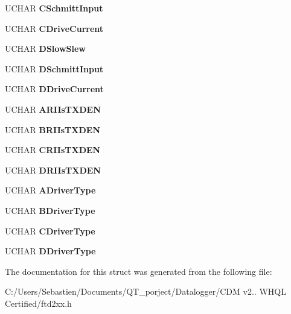 \begin{DoxyCompactItemize}
U\+C\+H\+AR {\bfseries C\+Schmitt\+Input}
\item 
\mbox{\label{structft__eeprom__4232h_a28fd0e83320d2b18d8e3494f019e8f4c}} 
U\+C\+H\+AR {\bfseries C\+Drive\+Current}
\item 
\mbox{\label{structft__eeprom__4232h_ae32b979b9db358e8b6613e41ed201110}} 
U\+C\+H\+AR {\bfseries D\+Slow\+Slew}
\item 
\mbox{\label{structft__eeprom__4232h_aba9def054b418e85177c70cae98cb17e}} 
U\+C\+H\+AR {\bfseries D\+Schmitt\+Input}
\item 
\mbox{\label{structft__eeprom__4232h_a36cb4f439c051c485013966f16adc5ab}} 
U\+C\+H\+AR {\bfseries D\+Drive\+Current}
\item 
\mbox{\label{structft__eeprom__4232h_aa9c900ec8d69e1a792a4b9bac1b4eeb9}} 
U\+C\+H\+AR {\bfseries A\+R\+I\+Is\+T\+X\+D\+EN}
\item 
\mbox{\label{structft__eeprom__4232h_aa9e48949d47395e2a805d93d4affa572}} 
U\+C\+H\+AR {\bfseries B\+R\+I\+Is\+T\+X\+D\+EN}
\item 
\mbox{\label{structft__eeprom__4232h_a7b4666be110ff5f59976c3a5f67ba13d}} 
U\+C\+H\+AR {\bfseries C\+R\+I\+Is\+T\+X\+D\+EN}
\item 
\mbox{\label{structft__eeprom__4232h_aff58f44eb2769cd3d614cdd03357a56c}} 
U\+C\+H\+AR {\bfseries D\+R\+I\+Is\+T\+X\+D\+EN}
\item 
\mbox{\label{structft__eeprom__4232h_a6a17d8b26142bd25157ea275e8034f11}} 
U\+C\+H\+AR {\bfseries A\+Driver\+Type}
\item 
\mbox{\label{structft__eeprom__4232h_a6a5cbfcb0e59bd89ed6338f44f8c5b5c}} 
U\+C\+H\+AR {\bfseries B\+Driver\+Type}
\item 
\mbox{\label{structft__eeprom__4232h_af1da86c7d0ff4bb811627c5d84c5ce79}} 
U\+C\+H\+AR {\bfseries C\+Driver\+Type}
\item 
\mbox{\label{structft__eeprom__4232h_a686ad080f8c280b2ca149233f584fb29}} 
U\+C\+H\+AR {\bfseries D\+Driver\+Type}
\end{DoxyCompactItemize}


The documentation for this struct was generated from the following file\+:\begin{DoxyCompactItemize}
\item 
C\+:/\+Users/\+Sebastien/\+Documents/\+Q\+T\+\_\+porject/\+Datalogger/\+C\+D\+M v2.. W\+H\+Q\+L Certified/ftd2xx.\+h\end{DoxyCompactItemize}
